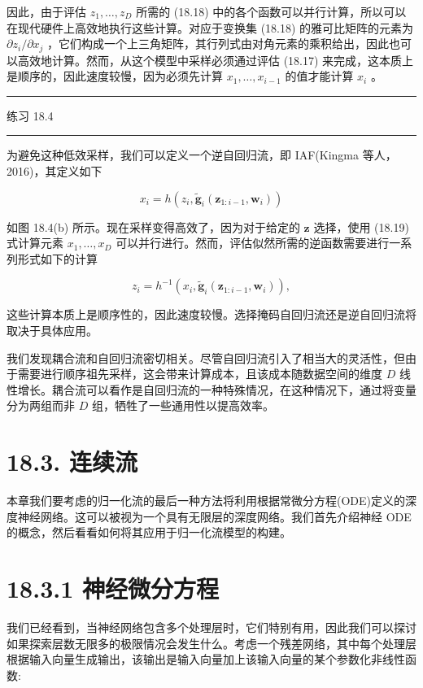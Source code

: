 \documentclass[10pt]{report}
\newcommand{\HRule}{\begin{center}\rule{0.9\linewidth}{0.2mm}\end{center}}
\begin{document}
因此，由于评估 \({z}_{1},\ldots ,{z}_{D}\) 所需的 (18.18) 中的各个函数可以并行计算，所以可以在现代硬件上高效地执行这些计算。对应于变换集 (18.18) 的雅可比矩阵的元素为 \(\partial {z}_{i}/\partial {x}_{j}\) ，它们构成一个上三角矩阵，其行列式由对角元素的乘积给出，因此也可以高效地计算。然而，从这个模型中采样必须通过评估 (18.17) 来完成，这本质上是顺序的，因此速度较慢，因为必须先计算 \({x}_{1},\ldots ,{x}_{i - 1}\) 的值才能计算 \({x}_{i}\) 。

\HRule

练习 18.4

\HRule

为避免这种低效采样，我们可以定义一个逆自回归流，即 IAF(Kingma 等人，2016)，其定义如下

\[
{x}_{i} = h\left( {{z}_{i},{\widetilde{\mathbf{g}}}_{i}\left( {{\mathbf{z}}_{1 : i - 1},{\mathbf{w}}_{i}}\right) }\right)  \tag{18.19}
\]

如图 18.4(b) 所示。现在采样变得高效了，因为对于给定的 \(\mathbf{z}\) 选择，使用 (18.19) 式计算元素 \({x}_{1},\ldots ,{x}_{D}\) 可以并行进行。然而，评估似然所需的逆函数需要进行一系列形式如下的计算

\[
{z}_{i} = {h}^{-1}\left( {{x}_{i},{\widetilde{\mathbf{g}}}_{i}\left( {{\mathbf{z}}_{1 : i - 1},{\mathbf{w}}_{i}}\right) }\right) , \tag{18.20}
\]

这些计算本质上是顺序性的，因此速度较慢。选择掩码自回归流还是逆自回归流将取决于具体应用。

我们发现耦合流和自回归流密切相关。尽管自回归流引入了相当大的灵活性，但由于需要进行顺序祖先采样，这会带来计算成本，且该成本随数据空间的维度 \(D\) 线性增长。耦合流可以看作是自回归流的一种特殊情况，在这种情况下，通过将变量分为两组而非 \(D\) 组，牺牲了一些通用性以提高效率。

\section*{18.3. 连续流}

本章我们要考虑的归一化流的最后一种方法将利用根据常微分方程(ODE)定义的深度神经网络。这可以被视为一个具有无限层的深度网络。我们首先介绍神经 ODE 的概念，然后看看如何将其应用于归一化流模型的构建。

\section*{18.3.1 神经微分方程}

我们已经看到，当神经网络包含多个处理层时，它们特别有用，因此我们可以探讨如果探索层数无限多的极限情况会发生什么。考虑一个残差网络，其中每个处理层根据输入向量生成输出，该输出是输入向量加上该输入向量的某个参数化非线性函数:
\end{document}
